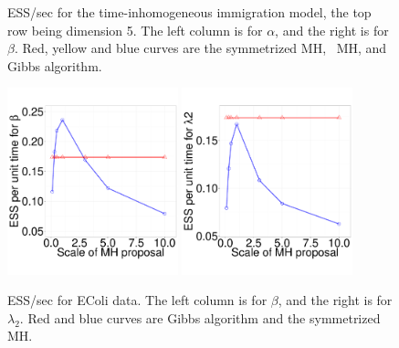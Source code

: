 \begin{figure}[H]
\begin{minipage}[!hp]{0.65\linewidth}
  \end{minipage}
  \begin{minipage}[!hp]{0.33\linewidth}
    \caption{ESS/sec for the time-inhomogeneous immigration model, the top row 
      being dimension 5. The left column is for $\alpha$, and the 
    right is for $\beta$. Red, yellow and blue curves are the symmetrized MH,
  \naive\ MH, and Gibbs algorithm.}
     \label{fig:ESS_pc_5}
  \end{minipage}
  \centering
  \begin{minipage}[!hp]{0.64\linewidth}
	\hspace{.15in}
    \includegraphics [width=0.44\textwidth, angle=0]{figs/ECOLI_beta.pdf}
	\hspace{.15in}
    \includegraphics [width=0.44\textwidth, angle=0]{figs/ECOLI_l2.pdf}
  \end{minipage}
	\hspace{-.3in}
  \begin{minipage}[!hp]{0.05\linewidth}
	\hspace{0in}
	\end{minipage}
  \begin{minipage}[!hp]{0.33\linewidth}
    \caption{ESS/sec for EColi data. The left column is for $\beta$, and the 
    right is for $\lambda_2$. Red and blue curves are Gibbs algorithm and the symmetrized MH.}
  \end{minipage}
     \label{fig:ECOLI_beta_l2}
  \end{figure}
